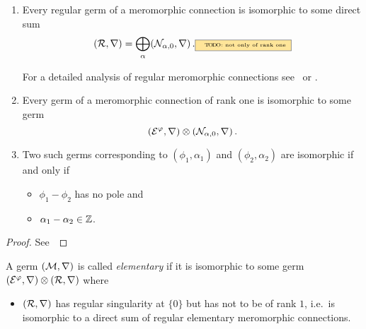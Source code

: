 \begin{prop}
  \begin{enumerate}
    \item
      Every regular germ of a meromorphic connection is isomorphic to some
      direct sum
      \[
        (\cR,\nabla)=\bigoplus_\alpha(\cN_{\alpha,0},\nabla)\,.
        \TODO[not only of rank one]
      \]
      \begin{s-rem}
        For a detailed analysis of regular meromorphic connections
        see~\cite[Sec.II.2]{sabbah2007isomonodromic} or
        \cite[Sec.5.2]{hotta2008}.
      \end{s-rem}
    \item Every germ of a meromorphic connection of rank one is isomorphic to
      some germ
      \[
        (\mathcal{E}^\varphi,\nabla)\otimes(\mathcal{N}_{\alpha,0},\nabla) \,.
      \]
    \item Two such germs corresponding to $(\phi_1,\alpha_1)$ and
      $(\phi_2,\alpha_2)$ are isomorphic if and only if
      \begin{itemize}
        \item $\phi_1-\phi_2$ has no pole and
        \item $\alpha_1-\alpha_2\in\mathbb{Z}$.
      \end{itemize}
  \end{enumerate}
\end{prop}
\begin{proof}
  See~\cite[Prop.II.5.1]{sabbah2007isomonodromic}
\end{proof}
\begin{defn}
  A germ $(\mathcal{M},\nabla)$ is called \emph{elementary} if it is isomorphic to
  some germ $(\mathcal{E}^\varphi,\nabla)\otimes(\mathcal{R},\nabla)$ where
  \begin{itemize}
    \item $(\mathcal{R},\nabla)$ has regular singularity at $\{0\}$ but has not to be
      of rank $1$, i.e.\ is isomorphic to a direct sum of regular elementary
      meromorphic connections.
  \end{itemize}
\end{defn}
